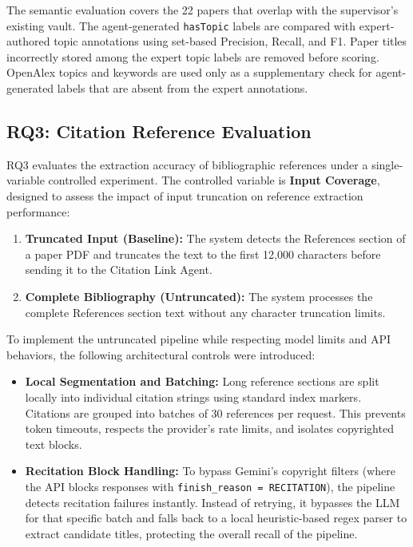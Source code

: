 \documentclass[runningheads]{llncs}
\begin{document}
The semantic evaluation covers the 22 papers that overlap with the supervisor's existing vault. The agent-generated \texttt{hasTopic} labels are compared with expert-authored topic annotations using set-based Precision, Recall, and F1. Paper titles incorrectly stored among the expert topic labels are removed before scoring. OpenAlex topics and keywords are used only as a supplementary check for agent-generated labels that are absent from the expert annotations.

\subsection{RQ3: Citation Reference Evaluation}
\label{sec:rq3_method}

RQ3 evaluates the extraction accuracy of bibliographic references under a single-variable controlled experiment. The controlled variable is \textbf{Input Coverage}, designed to assess the impact of input truncation on reference extraction performance:

\begin{enumerate}
    \item \textbf{Truncated Input (Baseline):} The system detects the References section of a paper PDF and truncates the text to the first 12,000 characters before sending it to the Citation Link Agent.
    \item \textbf{Complete Bibliography (Untruncated):} The system processes the complete References section text without any character truncation limits.
\end{enumerate}

To implement the untruncated pipeline while respecting model limits and API behaviors, the following architectural controls were introduced:
\begin{itemize}
    \item \textbf{Local Segmentation and Batching:} Long reference sections are split locally into individual citation strings using standard index markers. Citations are grouped into batches of 30 references per request. This prevents token timeouts, respects the provider's rate limits, and isolates copyrighted text blocks.
    \item \textbf{Recitation Block Handling:} To bypass Gemini's copyright filters (where the API blocks responses with \texttt{finish\_reason = RECITATION}), the pipeline detects recitation failures instantly. Instead of retrying, it bypasses the LLM for that specific batch and falls back to a local heuristic-based regex parser to extract candidate titles, protecting the overall recall of the pipeline.
\end{itemize}
\end{document}
